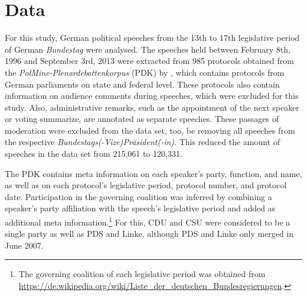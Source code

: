 \documentclass[11pt]{article}
\begin{document}

\section{Data}

For this study, German political speeches from the 13th to 17th legislative period of German \textit{Bundestag} were analysed.
The speeches held between February 8th, 1996 and September 3rd, 2013 were extracted from 985 protocols obtained from the \textit{PolMine-Plenardebattenkorpus} (PDK) by \textcite[][]{???}, which contains protocols from German parliaments on state and federal level. These protocols also contain information on audience comments during speeches, which were excluded for this study. Also, administrative remarks, such as the appointment of the next speaker or voting summarize, are annotated as separate speeches. These passages of moderation were excluded from the data set, too, be removing all speeches from the respective \textit{Bundestags(-Vize)Präsident(-in)}. This reduced the amount of speeches in the data set from 215,061 to 120,331.

The PDK contains meta information on each speaker's party, function, and name, as well as on each protocol's legislative period, protocol number, and protocol date. 
Participation in the governing coalition was inferred by combining a speaker's party affiliation with the speech's legislative period and added as additional meta information.\footnote{The governing coalition of each legislative period was obtained from \url{https://de.wikipedia.org/wiki/Liste_der_deutschen_Bundesregierungen}.} For this, CDU and CSU were considered to be a single party as well as PDS and Linke, although PDS and Linke only merged in June 2007.
\end{document}
